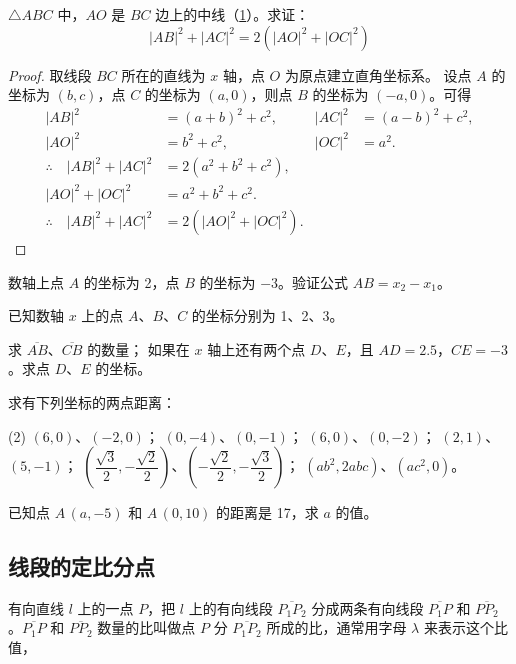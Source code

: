 \begin{example}
  $\triangle ABC$ 中，$AO$ 是 $BC$ 边上的中线（\cref{fig:1-9}）。求证：
  \[ |AB|^2 + |AC|^2 =2(|AO|^2+|OC|^2)\]
\end{example}
\begin{figure}
  \caption{}\label{fig:1-9}
\end{figure}
\begin{proof}
  取线段 $BC$ 所在的直线为 $x$ 轴，点 $O$ 为原点建立直角坐标系。
  设点 $A$ 的坐标为 $(b,c)$，点 $C$ 的坐标为 $(a,0)$，则点 $B$ 的坐标为 $(-a,0)$。可得
  \begin{align*}
    |AB|^2 &=(a+b)^2+c^2, & |AC|^2&=(a-b)^2+c^2,\\
    |AO|^2 &=b^2+c^2, & |OC|^2&=a^2.\\
    \therefore\quad |AB|^2 +|AC|^2 &=2(a^2+b^2+c^2),\\
    |AO|^2 +|OC|^2 &=a^2+b^2+c^2.\\
    \therefore\quad |AB|^2 +|AC|^2 &=2(|AO|^2 +|OC|^2).
  \end{align*}
\end{proof}

\begin{Practice}
  \begin{question}
    \item 数轴上点 $A$ 的坐标为 2，点 $B$ 的坐标为 $-3$。验证公式 $AB=x_2-x_1$。
    \item 已知数轴 $x$ 上的点 $A$、$B$、$C$ 的坐标分别为 1、2、3。
    \begin{tasks}
      \task 求 $\overline{AB}$、$\overline{CB}$ 的数量；
      \task 如果在 $x$ 轴上还有两个点 $D$、$E$，且 $AD=2.5$，$CE=-3$。求点 $D$、$E$ 的坐标。
    \end{tasks}
    \item 求有下列坐标的两点距离：
    \begin{tasks}(2)
      \task  $(6,0)$、$(-2,0)$；
      \task  $(0,-4)$、$(0,-1)$；
      \task  $(6,0)$、$(0,-2)$；
      \task  $(2,1)$、$(5,-1)$；
      \task  $\left(\dfrac{\sqrt{3}}{2},-\dfrac{\sqrt{2}}{2}\right)$、$\left(-\dfrac{\sqrt{2}}{2},-\dfrac{\sqrt{3}}{2}\right)$；
      \task  $(ab^2,2abc)$、$(ac^2,0)$。
    \end{tasks}
    \item 已知点 $A\,(a,-5)$ 和 $A\,(0,10)$ 的距离是 17，求 $a$ 的值。
  \end{question}
\end{Practice}

\subsection{线段的定比分点}
有向直线 $l$ 上的一点 $P$，把 $l$ 上的有向线段 $\overline{P_1P_2}$ 分成两条有向线段 $\overline{P_1P}$ 和 $\overline{PP_2}$。$\overline{P_1P}$ 和 $\overline{PP_2}$ 数量的比叫做点 $P$ 分 $\overline{P_1P_2}$ 所成的比，通常用字母 $\lambda$ 来表示这个比值，

